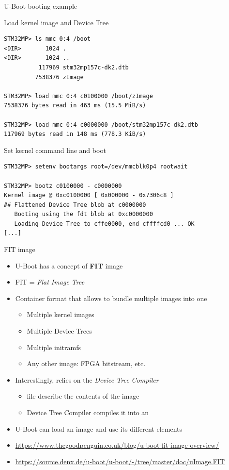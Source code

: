 \begin{frame}[fragile]{U-Boot booting example}
  \begin{block}{Load kernel image and Device Tree}
    {\tiny
\begin{verbatim}
STM32MP> ls mmc 0:4 /boot
<DIR>       1024 .
<DIR>       1024 ..
          117969 stm32mp157c-dk2.dtb
         7538376 zImage

STM32MP> load mmc 0:4 c0100000 /boot/zImage
7538376 bytes read in 463 ms (15.5 MiB/s)

STM32MP> load mmc 0:4 c0000000 /boot/stm32mp157c-dk2.dtb
117969 bytes read in 148 ms (778.3 KiB/s)
\end{verbatim}
    }
  \end{block}

  \begin{block}{Set kernel command line and boot}
    {\tiny
\begin{verbatim}
STM32MP> setenv bootargs root=/dev/mmcblk0p4 rootwait

STM32MP> bootz c0100000 - c0000000
Kernel image @ 0xc0100000 [ 0x000000 - 0x7306c8 ]
## Flattened Device Tree blob at c0000000
   Booting using the fdt blob at 0xc0000000
   Loading Device Tree to cffe0000, end cffffcd0 ... OK
[...]
\end{verbatim}
    }
  \end{block}
\end{frame}

\begin{frame}{FIT image}
  \begin{itemize}
  \item U-Boot has a concept of {\bf FIT} image
  \item FIT = {\em Flat Image Tree}
  \item Container format that allows to bundle multiple images into
    one
    \begin{itemize}
    \item Multiple kernel images
    \item Multiple Device Trees
    \item Multiple initramfs
    \item Any other image: FPGA bitstream, etc.
    \end{itemize}
  \item Interestingly, relies on the {\em Device Tree Compiler}
    \begin{itemize}
    \item {} file describe the contents of the image
    \item Device Tree Compiler compiles it into an 
    \end{itemize}
  \item U-Boot can load an  image and use its different
    elements
  \item \url{https://www.thegoodpenguin.co.uk/blog/u-boot-fit-image-overview/}
  \item \url{https://source.denx.de/u-boot/u-boot/-/tree/master/doc/uImage.FIT}
  \end{itemize}
\end{frame}

